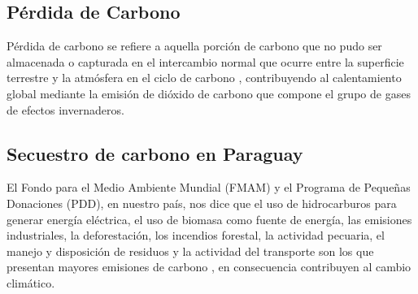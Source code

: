 \subsection{P\'erdida de Carbono}
P\'erdida de carbono se refiere a aquella porci\'on de carbono que no pudo ser almacenada o capturada en el intercambio normal que ocurre entre la superficie terrestre y la atm\'osfera en el ciclo de carbono \cite{marquezestimacion}, contribuyendo al calentamiento global mediante la emisión de di\'oxido de carbono que compone el grupo de gases de efectos invernaderos.
\subsection{Secuestro de carbono en Paraguay}
El Fondo para el Medio Ambiente Mundial (FMAM) y el Programa de Peque\~{n}as Donaciones (PDD), en nuestro pa\'is, nos dice que el uso de hidrocarburos para generar energ\'ia el\'ectrica, el uso de biomasa como fuente de energ\'ia, las emisiones industriales, la deforestaci\'on, los incendios forestal, la actividad pecuaria, el manejo y disposici\'on de residuos y la actividad del transporte son los que presentan mayores emisiones de carbono \cite{cecilia2010Proyecto}, en consecuencia contribuyen al cambio clim\'atico.
